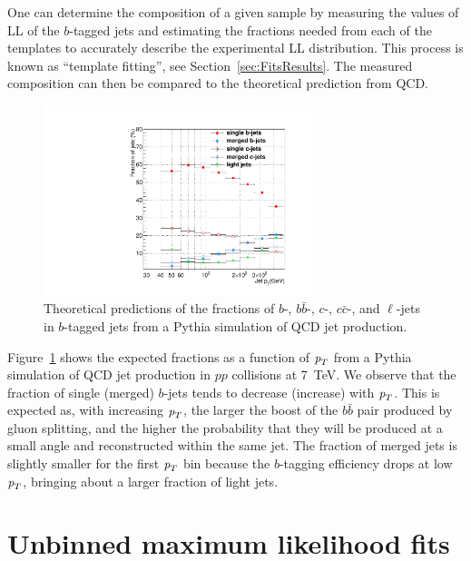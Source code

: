 One can determine the composition of a given sample by measuring the values of LL of the $b$-tagged jets and estimating the fractions needed from each of the templates to accurately describe the experimental LL distribution. This process is known as ``template fitting'', see Section~\ref{sec:FitsResults}. The measured composition can then be compared to the theoretical prediction from QCD. 
\begin{figure}[htb]
\centering
\includegraphics[width=0.70\textwidth]{TrueFractions_NominalPythia.pdf}
\caption{Theoretical predictions of the fractions of $b$-, $b\bar{b}$-, $c$-, $c\bar{c}$-, and $\ell$-jets in $b$-tagged jets from a {\sc Pythia} simulation of QCD jet production.}
\label{fig:truefractions}
\end{figure}
Figure~\ref{fig:truefractions} shows the expected fractions as a function of ${\emph{p}_{T}}$ from a {\sc Pythia} simulation of QCD jet production in $pp$ collisions at 7~TeV. We observe that the fraction of single (merged) $b$-jets tends to decrease (increase) with ${\emph{p}_{T}}$. This is expected as, with increasing ${\emph{p}_{T}}$, the larger the boost of the $b\bar{b}$ pair produced by gluon splitting, and the higher the probability that they will be produced at a small angle and reconstructed within the same jet. The fraction of merged jets is slightly smaller for the first ${\emph{p}_{T}}$ bin because the $b$-tagging efficiency drops at low ${\emph{p}_{T}}$, bringing about a larger fraction of light jets. 


\section{Unbinned maximum likelihood fits}\label{sec:LLFits}

